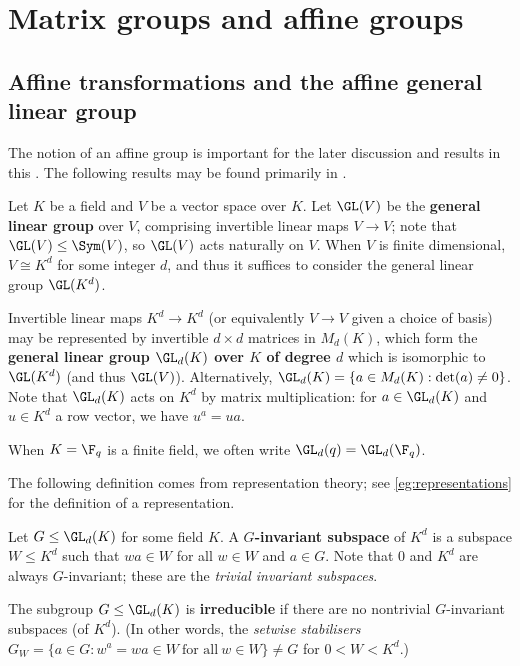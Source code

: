 \section{Matrix groups and affine groups}

\subsection{Affine transformations and the affine general linear group}

The notion of an affine group is important for the later discussion and results in this \thesis{}. The following results may be found primarily in \cite{dixon_mortimer_perm_groups1996}.

\begin{definition}\label{def:gl_group}
    Let $K$ be a field and $V$ be a vector space over $K$. Let $\GL(V)$ be the \textbf{general linear group} over $V$, comprising invertible linear maps $V \to V$; note that $\GL(V) \leq \Sym(V)$, so $\GL(V)$ acts naturally on $V$. When $V$ is finite dimensional, $V \cong K^d$ for some integer $d$, and thus it suffices to consider the general linear group $\GL(K^d)$.

    Invertible linear maps $K^d \to K^d$ (or equivalently $V \to V$ given a choice of basis) may be represented by invertible $d \times d$ matrices in $M_d(K)$, which form the \textbf{general linear group $\GL_d(K)$ over $K$ of degree $d$} which is isomorphic to $\GL(K^d)$ (and thus $\GL(V)$). Alternatively, $\GL_d(K) = \{a \in M_d(K) : \det(a) \neq 0\}$. Note that $\GL_d(K)$ acts on $K^d$ by matrix multiplication: for $a \in \GL_d(K)$ and $u \in K^d$ a row vector, we have $u^a = ua$.

    When $K = \F_q$ is a finite field, we often write $\GL_d(q) = \GL_d(\F_q)$.
\end{definition}

The following definition comes from representation theory; see \autoref{eg:representations} for the definition of a representation.

\begin{definition}\label{def:irred_subgroup}
    Let $G \leq \GL_d(K)$ for some field $K$. A \textbf{$G$-invariant subspace} of $K^d$ is a subspace $W \leq K^d$ such that $wa \in W$ for all $w \in W$ and $a \in G$. Note that $0$ and $K^d$ are always $G$-invariant; these are the \textit{trivial invariant subspaces}.

    The subgroup $G \leq \GL_d(K)$ is \textbf{irreducible} if there are no nontrivial $G$-invariant subspaces (of $K^d$). (In other words, the \textit{setwise stabilisers} $G_W = \{a \in G : w^a = wa \in W\ \text{for all}\ w \in W\} \neq G$ for $0 < W < K^d$.)
\end{definition}

